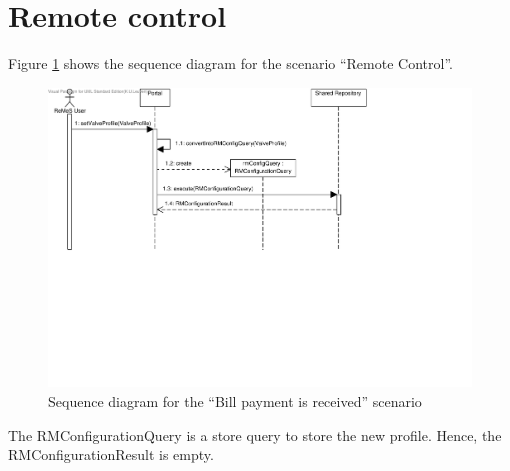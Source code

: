 \section{Remote control}
\label{scenario:remote-control}

\npar Figure \ref{fig:scenario-5-4} shows the sequence diagram for the scenario
``Remote Control''.

\begin{figure}[H]
	\begin{centering}
		\includegraphics[width=\textwidth]{figs/scenario-5-4.pdf}
		\caption{Sequence diagram for the ``Bill payment is received'' scenario}
		\label{fig:scenario-5-4}
	\end{centering}
\end{figure}

\npar The RMConfigurationQuery is a store query to store the new profile. Hence,
the RMConfigurationResult is empty.
